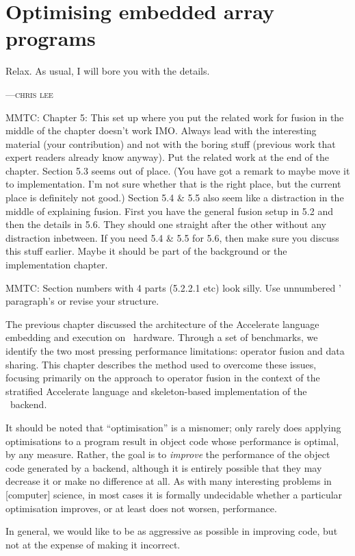 
\chapter{Optimising embedded array programs}
\label{ch:optimising}
\epigraph{Relax. As usual, I will bore you with the details.}%
{\textsc{---chris lee}}

MMTC: Chapter 5: This set up where you put the related work for fusion in the middle of the chapter doesn't work IMO. Always lead with the interesting material (your contribution) and not with the boring stuff (previous work that expert readers already know anyway). Put the related work at the end of the chapter.
Section 5.3 seems out of place. (You have got a remark to maybe move it to implementation. I'm not sure whether that is the right place, but the current place is definitely not good.)
Section 5.4 \& 5.5 also seem like a distraction in the middle of explaining fusion. First you have the general fusion setup in 5.2 and then the details in 5.6. They should one straight after the other without any distraction inbetween. If you need 5.4 \& 5.5 for 5.6, then make sure you discuss this stuff earlier. Maybe it should be part of the background or the implementation chapter.

MMTC: Section numbers with 4 parts (5.2.2.1 etc) look silly. Use unnumbered '\\paragraph's or revise your structure.

The previous chapter discussed the architecture of the Accelerate language
embedding and execution on \CUDA\ hardware. Through a set of benchmarks, we
identify the two most pressing performance limitations: operator fusion and data
sharing. This chapter describes the method used to overcome these issues,
focusing primarily on the approach to operator fusion in the context of the
stratified Accelerate language and skeleton-based implementation of the \CUDA\
backend.

It should be noted that ``optimisation'' is a misnomer; only rarely does
applying optimisations to a program result in object code whose performance is
optimal, by any measure. Rather, the goal is to \emph{improve} the performance
of the object code generated by a backend, although it is entirely possible that
they may decrease it or make no difference at all. As with many interesting
problems in [computer] science, in most cases it is formally undecidable whether
a particular optimisation improves, or at least does not worsen, performance.

In general, we would like to be as aggressive as possible in improving code, but
not at the expense of making it incorrect.


